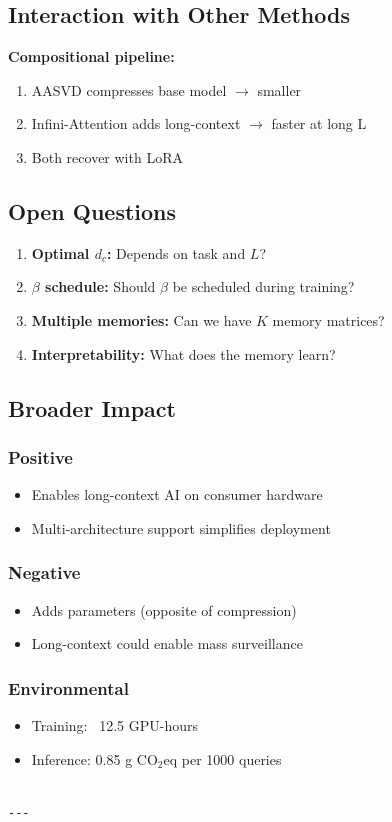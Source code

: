 \subsection{Interaction with Other Methods}

\textbf{Compositional pipeline:}

\begin{enumerate}
\item AASVD compresses base model $\to$ smaller
\item Infini-Attention adds long-context $\to$ faster at long L
\item Both recover with LoRA

\end{enumerate}
\subsection{Open Questions}

\begin{enumerate}
\item \textbf{Optimal $d_c$:} Depends on task and $L$?
\item \textbf{$\beta$ schedule:} Should $\beta$ be scheduled during training?
\item \textbf{Multiple memories:} Can we have $K$ memory matrices?
\item \textbf{Interpretability:} What does the memory learn?

\end{enumerate}
\subsection{Broader Impact}

\subsubsection{Positive}
\begin{itemize}
\item Enables long-context AI on consumer hardware
\item Multi-architecture support simplifies deployment

\end{itemize}
\subsubsection{Negative}
\begin{itemize}
\item Adds parameters (opposite of compression)
\item Long-context could enable mass surveillance

\end{itemize}
\subsubsection{Environmental}
\begin{itemize}
\item Training: ~12.5 GPU-hours
\item Inference: 0.85 g CO$_2$eq per 1000 queries
\end{itemize}
\begin{lstlisting}

---
\end{lstlisting}